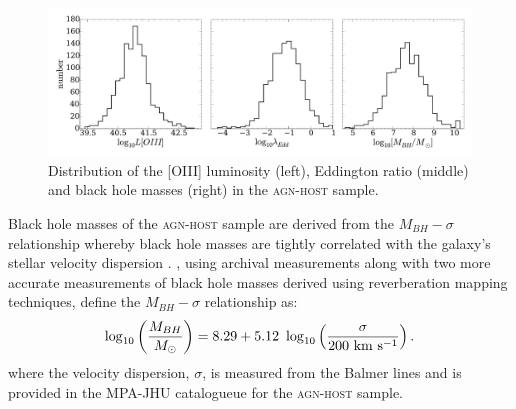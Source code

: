 \begin{figure}[t]
\includegraphics[width=\textwidth]{agn/agn-host_distributions_loiii_edd_ratio_mbh.pdf}
\caption[Distribution of measured galaxy parameters in the \textsc{agn-host} sample]{Distribution of the [OIII] luminosity (left), Eddington ratio (middle) and black hole masses (right) in the \textsc{agn-host} sample.}
\label{fig:agndistributions}
\end{figure}

Black hole masses of the \textsc{agn-host} sample are derived from the $M_{BH}-\sigma$ relationship whereby black hole masses are tightly correlated with the galaxy's stellar velocity dispersion \citep{magorrian98, marconi03, haringrix04}. \citet{mcconnell11}, using archival measurements along with two more accurate measurements of black hole masses derived using reverberation mapping techniques, define the $M_{BH}-\sigma$ relationship as:
\begin{equation}
\log_{10}\left(\frac{M_{BH}}{M_{\odot}}\right) = 8.29 + 5.12 ~\log_{10}\left(\frac{\sigma}{200 ~\rm{km} ~s^{-1}}\right). 
\end{equation}
where the velocity dispersion, $\sigma$, is measured from the Balmer lines and is provided in the MPA-JHU catalogueue \citep{kauffmann03, brinchmann04} for the \textsc{agn-host} sample.

